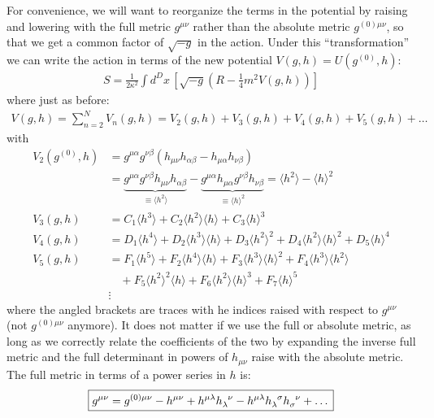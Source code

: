 \documentclass{book}
\theoremstyle{definition}
\newcommand{\nn}{\nonumber}
\newcommand{\f}[2]{\frac{#1}{#2}}
\newcommand{\lp}{\left(}
\newcommand{\rp}{\right)}
\newcommand{\lb}{\left[}
\newcommand{\rb}{\right]}
\begin{document}
For convenience, we will want to reorganize the terms in the potential by raising and lowering with the full metric $g^{\mu\nu}$ rather than the absolute metric $g^{(0)\mu\nu}$, so that we get a common factor of $\sqrt{-g}$ in the action. Under this ``transformation'' we can write the action in terms of the new potential $V(g,h) = U(g^{(0)},h)$:
\begin{align}\label{general-pot}
\boxed{S = \f{1}{2\kappa^2}\int d^Dx\, \lb \sqrt{-g}\lp R - \f{1}{4}m^2 V(g,h) \rp \rb}
\end{align}
where just as before:
\begin{align}
\boxed{V(g,h) = \sum^N_{n=2}V_n(g,h) = V_2(g,h) + V_3(g,h) + V_4(g,h) + V_5(g,h) + \dots}
\end{align}
with 
\begin{align}
V_2(g^{(0)},h) &= g^{\mu\alpha}g^{\nu\beta}\lp h_{\mu\nu}h_{\alpha\beta} - h_{\mu\alpha}h_{\nu\beta} \rp   \nn\\
&= \underbrace{g^{\mu\alpha}g^{\nu\beta}h_{\mu\nu}h_{\alpha\beta}}_{\equiv \langle h^2\rangle } - \underbrace{g^{\mu\alpha}h_{\mu\alpha}g^{\nu\beta}h_{\nu\beta}}_{\equiv \langle h \rangle ^2}= \langle h^2\rangle  - \langle h\rangle ^2\nn\\
V_3(g,h) &= C_1\langle h^3 \rangle  + C_2\langle h^2\rangle \langle h\rangle + C_3\langle h\rangle^3\nn\\
V_4(g,h) &= D_1\langle h^4\rangle  + D_2\langle h^3\rangle \langle h\rangle + D_3\langle h^2\rangle^2 + D_4\langle h^2\rangle\langle h\rangle^2 + D_5\langle h\rangle^4\nn\\
V_5(g,h) &= F_1\langle h^5\rangle  + F_2\langle h^4\rangle\langle h\rangle + F_3\langle h^3\rangle \langle h\rangle^2 + F_4\langle h^3\rangle\langle h^2\rangle\nn\\ &\,\,\,\,\,\,+ F_5\langle h^2\rangle^2\langle h\rangle + F_6\langle h^2\rangle\langle h\rangle^3 + F_7\langle h\rangle^5\nn\\
&\vdots
\end{align}
where the angled brackets are traces with he indices raised with respect to $g^{\mu\nu}$ (not $g^{(0)\mu\nu}$ anymore). It does not matter if we use the full or absolute metric, as long as we correctly relate the coefficients of the two by expanding the inverse full metric and the full determinant in powers of $h_{\mu\nu}$ raise with the absolute metric. The full metric in terms of a power series in $h$ is:
\begin{align}
\boxed{g^{\mu\nu} = g^{(0)\mu\nu} - h^{\mu\nu} + h^{\mu\lambda}\tensor{h}{_\lambda^\nu} - h^{\mu\lambda}\tensor{h}{_\lambda^\sigma}\tensor{h}{_\sigma^\nu} + \dots}
\end{align}
\end{document}
